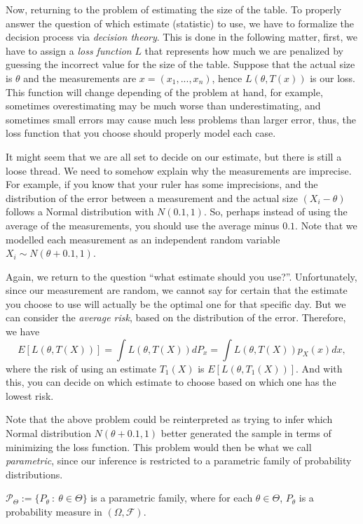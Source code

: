 Now, returning to the problem of estimating the size of the table. To properly answer the question
of which estimate (statistic) to use, we have to formalize the decision process via \textit{decision
	theory}. This is done in the following matter, first, we have to assign a \textit{loss function}
$L$ that represents how much we are penalized by guessing the incorrect value for the size
of the table. Suppose that the actual size is $\theta$ and the measurements are
$x = (x_1,...,x_{n})$, hence $L(\theta, T(x))$ is our loss. This function will change
depending of the problem at hand, for example, sometimes overestimating may be much worse
than underestimating, and sometimes small errors may cause much less problems than larger
error, thus, the loss function that you choose should properly model each case.

It might seem that we are all set to decide on our estimate, but there is still a
loose thread. We need to somehow explain why the measurements are imprecise.
For example, if you know that your ruler has some imprecisions, and the distribution
of the error between a measurement and the actual size $(X_i - \theta)$ follows
a Normal distribution with $N(0.1,1)$. So, perhaps instead of using the average of the
measurements, you should use the average minus $0.1$. Note that we modelled each
measurement as an independent random variable $X_i \sim N(\theta + 0.1,1)$.

Again, we return to the question ``what estimate should you use?''. Unfortunately, since
our measurement are random, we cannot say for certain that the estimate you choose to use
will actually be the optimal one for that specific day. But we can consider the
\textit{average risk}, based on the distribution of the error. Therefore, we have
\begin{equation}
	E[L(\theta, T(X))] = \int L(\theta, T(X)) dP_x =
	\int L(\theta, T(X)) p_X(x) dx,
\end{equation}
where the risk of using an estimate $T_1(X)$ is $E[L(\theta, T_1(X))]$. And with this,
you can decide on which estimate to choose based on which one has the lowest risk.

Note that the above problem could be reinterpreted as trying to infer which
Normal distribution $N(\theta+0.1,1)$ better generated the sample in terms of
minimizing the loss function. This problem would then be what we call \textit{parametric},
since our inference is restricted to a parametric family of probability distributions.

\begin{definition}
	$\mathcal P_\Theta := \{P_\theta \ : \ \theta \in \Theta \}$ is a parametric family,
	where for each $\theta \in \Theta$, $P_\theta$ is a probability measure in
	$(\Omega, \mathcal F)$.
\end{definition}


